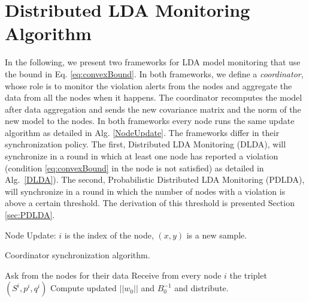\documentclass{vldb}
\begin{document}
\section{Distributed LDA Monitoring Algorithm}
In the following, we present two frameworks for LDA model monitoring that use
the bound in Eq. \ref{eq:convexBound}. 
In both frameworks, 
we define a \textit{coordinator}, whose role is to monitor the violation alerts from the nodes and aggregate the data from all the nodes when it happens. The coordinator recomputes the model after data aggregation and sends the new covariance matrix and the norm of the new model to the nodes.
In both frameworks every node runs the same
update algorithm as detailed in Alg. \ref{NodeUpdate}.
The frameworks differ in their synchronization policy. 
The first, Distributed LDA Monitoring (DLDA), will synchronize in a round
in which at least one node has reported a violation (condition \ref{eq:convexBound} in the node is not satisfied) as detailed in Alg.~\ref{DLDA}).
The second, Probabilistic Distributed LDA Monitoring (PDLDA), will synchronize in a round in which the number of nodes with a violation is above a certain
threshold.
The derivation of this threshold is presented Section \ref{sec:PDLDA}.


\begin{algorithm}
\caption{Node Update: $i$ is the index of the node, $(x,y)$ is a new sample.}
\label{NodeUpdate}
\end{algorithm}

\begin{algorithm}
\caption{Coordinator synchronization algorithm.}\label{DLDA}
\begin{algorithmic}[1]
\State Ask from the nodes for their data
\State Receive from every node $i$ the triplet $(S^i,p^i,q^i)$
\State Compute updated $||w_0||$ and $B_0^{-1}$ and distribute.
\EndIf
\EndProcedure
\end{algorithmic}
\end{algorithm}
\end{document}
